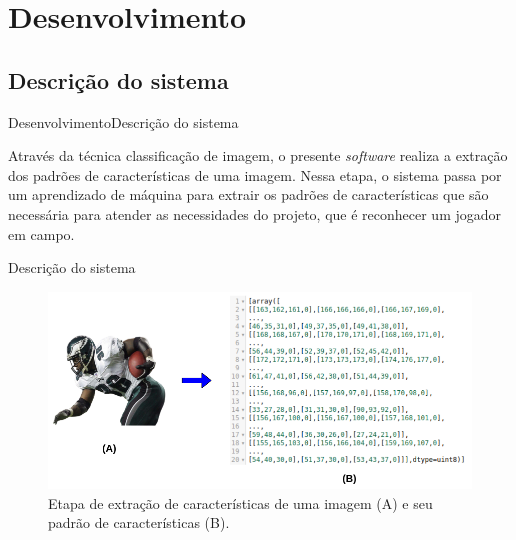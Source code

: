 \section{Desenvolvimento}
\subsection{Descrição do sistema}
\begin{frame}{Desenvolvimento}{Descrição do sistema}

Através da técnica classificação de imagem, o presente \textit{software} realiza a extração dos padrões de características de uma imagem. Nessa etapa, o sistema passa por um aprendizado de máquina para extrair os padrões de características que são necessária para atender as necessidades do projeto, que é reconhecer um jogador em campo.

\end{frame}

\begin{frame}{Descrição do sistema}
\begin{figure}
    \centering
    \caption{\label{fig_conversao_img}Etapa de extração de características de uma imagem (A) e seu padrão de características (B).}
    \includegraphics[scale=0.3]{05-SLIDES_DESENVOLVIMENTO/Imagens/conversao-de-imagem.png}
\end{figure}
\end{frame}